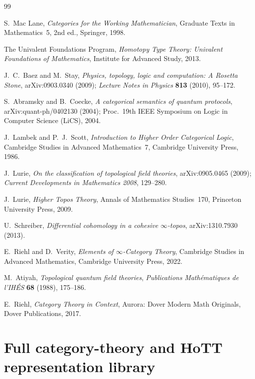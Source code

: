 \documentclass[12pt]{article}
\theoremstyle{definition}
\theoremstyle{remark}
\begin{document}
\begin{thebibliography}{99}

S.~Mac Lane,
\emph{Categories for the Working Mathematician},
Graduate Texts in Mathematics~5, 2nd ed., Springer, 1998.

The Univalent Foundations Program,
\emph{Homotopy Type Theory: Univalent Foundations of Mathematics},
Institute for Advanced Study, 2013.

J.~C.~Baez and M.~Stay,
\emph{Physics, topology, logic and computation: A Rosetta Stone},
arXiv:0903.0340 (2009); \emph{Lecture Notes in Physics} \textbf{813} (2010), 95--172.

S.~Abramsky and B.~Coecke,
\emph{A categorical semantics of quantum protocols},
arXiv:quant-ph/0402130 (2004); Proc.\ 19th IEEE Symposium on Logic in Computer Science (LiCS), 2004.

J.~Lambek and P.~J.~Scott,
\emph{Introduction to Higher Order Categorical Logic},
Cambridge Studies in Advanced Mathematics~7, Cambridge University Press, 1986.

J.~Lurie,
\emph{On the classification of topological field theories},
arXiv:0905.0465 (2009); \emph{Current Developments in Mathematics 2008}, 129--280.

J.~Lurie,
\emph{Higher Topos Theory},
Annals of Mathematics Studies~170, Princeton University Press, 2009.

U.~Schreiber,
\emph{Differential cohomology in a cohesive $\infty$-topos},
arXiv:1310.7930 (2013).

E.~Riehl and D.~Verity,
\emph{Elements of $\infty$-Category Theory},
Cambridge Studies in Advanced Mathematics, Cambridge University Press, 2022.

M.~Atiyah,
\emph{Topological quantum field theories},
\emph{Publications Math\'ematiques de l'IH\'ES} \textbf{68} (1988), 175--186.

E.~Riehl,
\emph{Category Theory in Context},
Aurora: Dover Modern Math Originals, Dover Publications, 2017.

\end{thebibliography}

\appendix
\section{Full category-theory and HoTT representation library}
\label{app:library}
\end{document}
